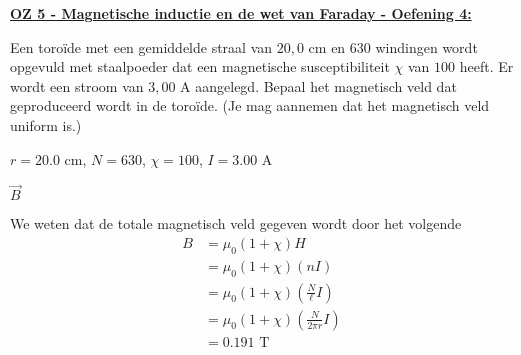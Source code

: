 \textbf{\underline{OZ 5 - Magnetische inductie en de wet van Faraday - Oefening 4:}}
\vspace{0.5cm}

Een toroïde met een gemiddelde straal van $20,0$ cm en $630$ windingen wordt opgevuld met staalpoeder dat een magnetische susceptibiliteit $\chi$ van $100$ heeft. Er wordt een stroom van $3,00$ A aangelegd. Bepaal het magnetisch veld dat geproduceerd wordt in de toroïde. (Je mag aannemen dat het magnetisch veld uniform is.)

\begin{description}[labelwidth=1.5cm, leftmargin=!]
    \item[Geg. :]  $r = 20.0$ cm, $N = 630$, $\chi = 100$, $I = 3.00$ A
    \item[Gevr. :] $\Vec{B}$
    \item[Opl. :]  
        We weten dat de totale magnetisch veld gegeven wordt door het volgende
        \begin{align*}
            B
                &= \mu_0 (1+\chi)H \\
                &= \mu_0 (1+\chi)(nI) \\
                &= \mu_0 (1+\chi)\left(\frac{N}{\ell}I\right) \\
                &= \mu_0 (1+\chi)\left(\frac{N}{2\pi r}I\right) \\
                &= 0.191 \text{ T}
        \end{align*}
\end{description}

\vspace{1cm}